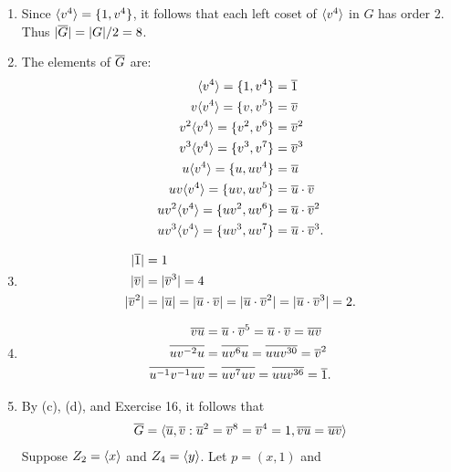 \begin{enumerate}
      \begin{enumerate}
         \item Since $\langle v^4 \rangle = \{1, v^4\}$, it follows that each left coset
               of $\langle v^4 \rangle$ in $G$ has order 2. Thus $|\overline{G}| = |G|/2 = 8$.
         \item The elements of $\overline{G}$ are:
               \begin{align*}
                  \langle v^4 \rangle = \{1, v^4\} &= \overline{1} \\
                  v\langle v^4 \rangle = \{v, v^5\} &= \overline{v} \\
                  v^2\langle v^4 \rangle = \{v^2, v^6\} &= \overline{v}^2 \\
                  v^3\langle v^4 \rangle =\{v^3, v^7\} &= \overline{v}^3 \\
                  u\langle v^4 \rangle = \{u, uv^4\} &= \overline{u} \\
                  uv\langle v^4 \rangle = \{uv, uv^5\} &= \overline{u} \cdot \overline{v} \\
                  uv^2\langle v^4 \rangle = \{uv^2, uv^6\} &= \overline{u} \cdot \overline{v}^2 \\
                  uv^3\langle v^4 \rangle = \{uv^3, uv^7\} &= \overline{u} \cdot \overline{v}^3.
               \end{align*}
         \item \begin{align*}
                  |\overline{1}| &= 1 \\
                  |\overline{v}| &= |\overline{v}^3| = 4 \\
                  |\overline{v}^2|&= |\overline{u}| = |\overline{u} \cdot \overline{v}| =
                  |\overline{u} \cdot \overline{v}^2| = |\overline{u} \cdot \overline{v}^3| = 2.
               \end{align*}
         \item \begin{align*}
                  \overline{vu} &= \overline{u} \cdot \overline{v}^5 = \overline{u} \cdot \overline{v} = \overline{uv} \\
                  \overline{uv^{-2}u} &= \overline{uv^6u} = \overline{uuv^{30}} = \overline{v}^2\\
                  \overline{u^{-1}v^{-1}uv} &= \overline{uv^7uv} = \overline{uuv^{36}} = \overline{1}.
               \end{align*}
         \item By (c), (d), and Exercise 16, it follows that
               \begin{align*}
                  \overline{G} = \langle \overline{u}, \overline{v} : \overline{u}^2 = \overline{v}^8 = \overline{v}^4 = 1,
                     \overline{vu} = \overline{uv} \rangle
               \end{align*}
               Suppose $Z_2 = \langle x \rangle$ and $Z_4 = \langle y \rangle$. Let $p = (x,1)$ and

\end{enumerate}
\end{enumerate}
